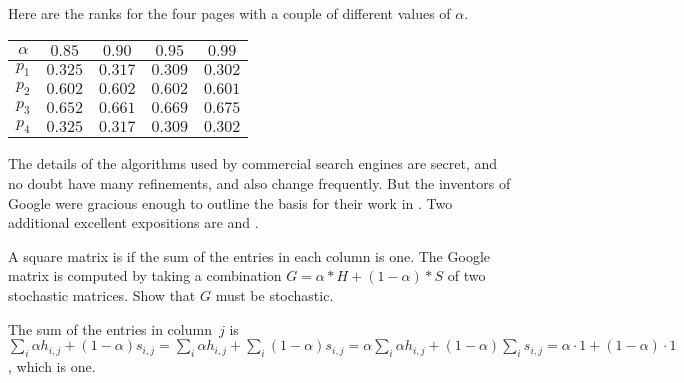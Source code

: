 Here are the ranks for the four pages with a couple of different values
of $\alpha$.
\begin{center}
  \begin{tabular}{r|cccc}
    \multicolumn{1}{c}{$\alpha$}
          &$0.85$  &$0.90$  &$0.95$ &$0.99$ \\ \hline
    $p_1$ &$0.325$ &$0.317$ &$0.309$  &$0.302$  \\
    $p_2$ &$0.602$ &$0.602$ &$0.602$  &$0.601$  \\
    $p_3$ &$0.652$ &$0.661$ &$0.669$  &$0.675$  \\
    $p_4$ &$0.325$ &$0.317$ &$0.309$  &$0.302$  
  \end{tabular}
\end{center}


\medskip
The details of the algorithms used by commercial search engines are 
secret, and no doubt have many refinements, and also change frequently.
But the inventors of Google were gracious enough to outline the basis for 
their work in \cite{BrinPage}.
Two additional excellent expositions are 
\cite{Wills} and
\cite{Austin}.

\begin{exercises}
  \item A square matrix is 
    if the sum of the entries in each column is one.
    The Google matrix is computed by taking a combination
    $G=\alpha*H+(1-\alpha)*S$ of two stochastic matrices.
    Show that $G$ must be stochastic.
    \begin{answer}
      The sum of the entries in column~$j$ is 
      $\sum_i \alpha h_{i,j}+(1-\alpha)s_{i,j}
       =\sum_i \alpha h_{i,j}+\sum_i (1-\alpha)s_{i,j}
       =\alpha\sum_i \alpha h_{i,j} +(1-\alpha)\sum_i s_{i,j}
       =\alpha\cdot 1+(1-\alpha)\cdot 1$,
      which is one.
    \end{answer}
\end{exercises}
\endinput


